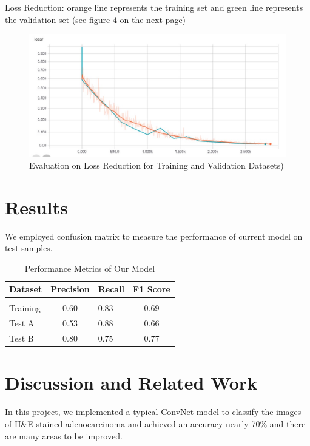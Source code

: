 \documentclass[twoside,11pt]{article}
\begin{document}
Loss Reduction: orange line represents the training set and green line represents the validation set
(see figure 4 on the next page)

\begin{figure}[htbp]
\centering
\includegraphics[width=.8\textwidth]{figure6.jpg}
\caption{Evaluation on Loss Reduction for Training and Validation Datasets)}
\label{figure1}
\end{figure}


\newpage
\section{Results} \label{results}
We employed confusion matrix to measure the performance of current model on test samples.

\begin{table}[htbp]
  \centering 
  \begin{tabular}{lclc} 
    Dataset & Precision & Recall & F1 Score\\ 
    \hline \\[-11pt]
    Training & 0.60 & 0.83 &0.69 \\ 
    Test A    & 0.53 & 0.88 & 0.66\\
    Test B    & 0.80 & 0.75 & 0.77 \\ \hline
  \end{tabular}
  \label{tab:example} 
    \caption{Performance Metrics of Our Model} 
\end{table}

\section{Discussion and Related Work} 
In this project, we implemented a typical ConvNet model to classify the images of H&E-stained adenocarcinoma and achieved an accuracy nearly 70\% and there are many areas to be improved. 
\end{document}
